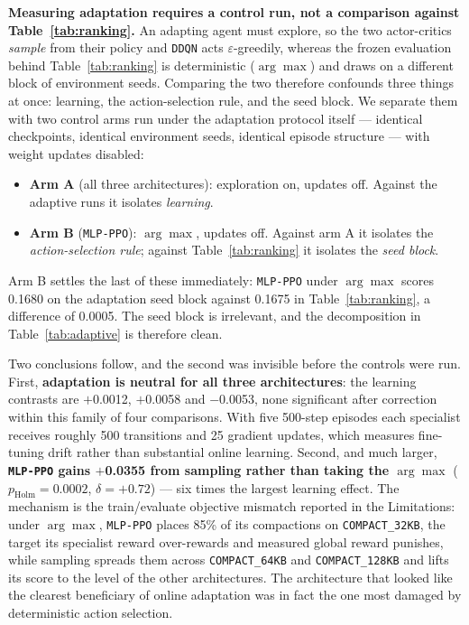 \documentclass[fleqn,10pt]{wlscirep}
\newcommand{\mlpppo}{\texttt{MLP-PPO}}
\newcommand{\ddqn}{\texttt{DDQN}}
\newcommand{\cthirtytwo}{\texttt{COMPACT\_32KB}}
\newcommand{\csixtyfour}{\texttt{COMPACT\_64KB}}
\newcommand{\conehundredtwentyeight}{\texttt{COMPACT\_128KB}}
\begin{document}
\textbf{Measuring adaptation requires a control run, not a comparison
against Table~\ref{tab:ranking}.} An adapting agent must explore, so the
two actor-critics \emph{sample} from their policy and \ddqn{} acts
$\varepsilon$-greedily, whereas the frozen evaluation behind
Table~\ref{tab:ranking} is deterministic ($\arg\max$) and draws on a
different block of environment seeds. Comparing the two therefore
confounds three things at once: learning, the action-selection rule, and
the seed block. We separate them with two control arms run under the
adaptation protocol itself --- identical checkpoints, identical
environment seeds, identical episode structure --- with weight updates
disabled:

\begin{itemize}
\item \textbf{Arm A} (all three architectures): exploration on, updates
  off. Against the adaptive runs it isolates \emph{learning}.
\item \textbf{Arm B} (\mlpppo{}): $\arg\max$, updates off. Against arm A
  it isolates the \emph{action-selection rule}; against
  Table~\ref{tab:ranking} it isolates the \emph{seed block}.
\end{itemize}

Arm B settles the last of these immediately: \mlpppo{} under $\arg\max$
scores 0.1680 on the adaptation seed block against 0.1675 in
Table~\ref{tab:ranking}, a difference of 0.0005. The seed block is
irrelevant, and the decomposition in Table~\ref{tab:adaptive} is
therefore clean.

Two conclusions follow, and the second was invisible before the controls
were run. First, \textbf{adaptation is neutral for all three
architectures}: the learning contrasts are $+$0.0012, $+$0.0058 and
$-$0.0053, none significant after correction within this family of four
comparisons. With five 500-step episodes each specialist receives
roughly 500 transitions and 25 gradient updates, which measures
fine-tuning drift rather than substantial online learning. Second, and
much larger, \textbf{\mlpppo{} gains $+$0.0355 from sampling rather than
taking the $\arg\max$} ($p_{\text{Holm}} = 0.0002$, $\delta = +0.72$) ---
six times the largest learning effect. The mechanism is the train/evaluate
objective mismatch reported in the Limitations: under $\arg\max$,
\mlpppo{} places 85\% of its compactions on \cthirtytwo{}, the target its
specialist reward over-rewards and measured global reward punishes, while
sampling spreads them across \csixtyfour{} and \conehundredtwentyeight{}
and lifts its score to the level of the other architectures. The
architecture that looked like the clearest beneficiary of online
adaptation was in fact the one most damaged by deterministic action
selection.
\end{document}

